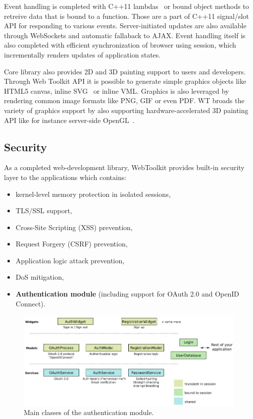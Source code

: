 \documentclass[a4paper,12pt]{book}
\newcommand\tab[1][1cm]{\hspace*{#1}}
\begin{document}
{{{\bigskip
Event handling is completed with C++11 lambdas~\cite{lambda} or bound object methods to retreive data that is bound to a function. Those are a part of C++11 signal/slot API for responding to various events. Server-initiated updates are also available through WebSockets and automatic fallaback to AJAX. Event handling itself is also completed with efficient synchronization of browser using session, which incrementally renders updates of application states.

\bigskip
Core library also provides 2D and 3D painting support to users and developers. Through Web Toolkit API it is possible to generate simple graphics objects like HTML5 canvas, inline SVG~\cite{svg} or inline VML. Graphics is also leveraged by rendering common image formats like PNG, GIF or even PDF. WT broads the variety of graphics support by also supporting hardware-accelerated 3D painting API like for instance server-side OpenGL~\cite{opengl}.
}

\subsection*{Security}
{
\tab As a completed web-development library, WebToolkit provides built-in security layer to the applications which contains:

\begin{itemize}
	\item kernel-level memory protection in isolated sessions,
	\item TLS/SSL support,
	\item Cross-Site Scripting (XSS) prevention,
	\item Request Forgery (CSRF) prevention,
	\item Application logic attack prevention,
	\item DoS mitigation,
	\item \textbf{Authentication module} (including support for OAuth 2.0 and OpenID Connect).
\end{itemize}

\begin{figure}[h]
  \centering
    \includegraphics[width=1.1\textwidth]{auth-module}
    \caption{Main classes of the authentication module\cite{authmodule}.}
\end{figure}

}}}
\end{document}
